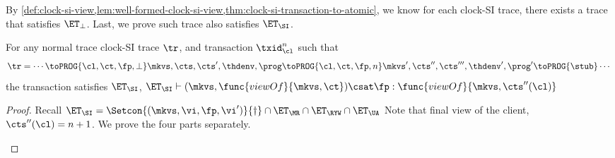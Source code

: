 By \cref{def:clock-si-view,lem:well-formed-clock-si-view,thm:clock-si-transaction-to-atomic},
we know for each clock-SI trace, there exists a trace that satisfies \( \ET_\perp \).
Last, we prove such trace also satisfies \( \ET_\SI \).
\begin{theorem}
    For any normal trace clock-SI trace \( \tr \), and transaction \( \txid_\cl^{n} \) such that
    \[
        \tr = \cdots \toPROG{\cl, \ct, \fp, \perp} \mkvs, \cts, \cts', \thdenv, \prog  \toPROG{\cl, \ct, \fp, n} \mkvs', \cts'', \cts''', \thdenv', \prog' \toPROG{\stub} \cdots
    \]
    the transaction satisfies \( \ET_\SI \), \ie \( \ET_\SI \vdash (\mkvs, \func{viewOf}{\mkvs,\ct}) \csat \fp : \func{viewOf}{\mkvs,\cts''(\cl)} \)
\end{theorem}
\begin{proof}
    Recall \( \ET_\SI  = \Setcon{(\mkvs, \vi, \fp, \vi')}{\dagger} \cap \ET_\MR \cap \ET_\RYW  \cap \ET_\UA \)
    Note that final view of the client, \( \cts''(\cl) = n + 1 \).
    We prove the four parts separately.
    \begin{itemize}

\end{itemize}
\end{proof}
